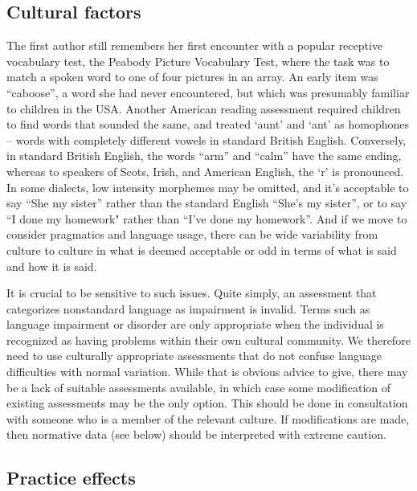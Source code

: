\documentclass{krantz}
\begin{document}
\hypertarget{cultural-factors}{%
\subsection{Cultural factors}\label{cultural-factors}}

The first author still remembers her first encounter with a popular receptive vocabulary test, the Peabody Picture Vocabulary Test, where the task was to match a spoken word to one of four pictures in an array. An early item was ``caboose'', a word she had never encountered, but which was presumably familiar to children in the USA. Another American reading assessment required children to find words that sounded the same, and treated `aunt' and `ant' as homophones -- words with completely different vowels in standard British English. Conversely, in standard British English, the words ``arm'' and ``calm'' have the same ending, whereas to speakers of Scots, Irish, and American English, the `r' is pronounced. In some dialects, low intensity morphemes may be omitted, and it's acceptable to say ``She my sister'' rather than the standard English ``She's my sister'', or to say ``I done my homework" rather than ``I've done my homework''. And if we move to consider pragmatics and language usage, there can be wide variability from culture to culture in what is deemed acceptable or odd in terms of what is said and how it is said.

It is crucial to be sensitive to such issues. Quite simply, an assessment that categorizes nonstandard language as impairment is invalid. Terms such as language impairment or disorder are only appropriate when the individual is recognized as having problems within their own cultural community. We therefore need to use culturally appropriate assessments that do not confuse language difficulties with normal variation. While that is obvious advice to give, there may be a lack of suitable assessments available, in which case some modification of existing assessments may be the only option. This should be done in consultation with someone who is a member of the relevant culture. If modifications are made, then normative data (see below) should be interpreted with extreme caution.

\hypertarget{practice-effects}{%
\subsection{Practice effects}\label{practice-effects}}
\end{document}
